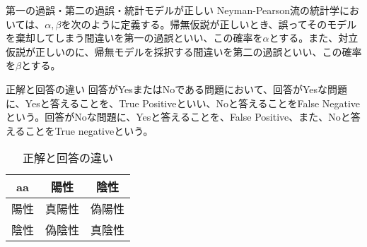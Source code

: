 \begin{SMbox}{第一の過誤・第二の過誤・統計モデルが正しい}
    Neyman-Pearson流の統計学においては、$\alpha,\beta$を次のように定義する。帰無仮説が正しいとき、誤ってそのモデルを棄却してしまう間違いを第一の過誤といい、この確率を$\alpha$とする。また、対立仮説が正しいのに、帰無モデルを採択する間違いを第二の過誤といい、この確率を$\beta$とする。



\end{SMbox}

\begin{SMbox}{正解と回答の違い}
回答がYesまたはNoである問題において、回答がYesな問題に、Yesと答えることを、True Positiveといい、Noと答えることをFalse Negativeという。回答がNoな問題に、Yesと答えることを、False Positive、また、Noと答えることをTrue negativeという。
\end{SMbox}


\begin{table}[hbtp]
\caption{正解と回答の違い}
\centering
\begin{tabular}{ccc}
    \hline
    aa  & 陽性  &  陰性 \\
    \hline \hline
    陽性 & 真陽性 & 偽陽性  \\
    陰性 & 偽陰性 & 真陰性\\
\end{tabular}
\end{table}



